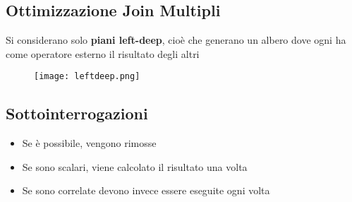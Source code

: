 \break
\subsection{Ottimizzazione Join Multipli}
Si considerano solo \textbf{piani left-deep}, cioè che generano un albero dove ogni  ha come operatore esterno il risultato degli altri 
\begin{figure}[htbp]
    \centering
    \texttt{[image: leftdeep.png]}
    \label{fig:leftdeep}
\end{figure}

\subsection{Sottointerrogazioni}
\begin{itemize}
    \item Se \`e possibile, vengono rimosse
    \item Se sono scalari, viene calcolato il risultato una volta
    \item Se sono correlate devono invece essere eseguite ogni volta
\end{itemize}